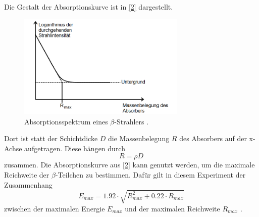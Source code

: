 Die Gestalt der Absorptionskurve ist in \autoref{2} dargestellt. 
\begin{figure}[H]
    \centering
    \includegraphics[width = 8cm]{2}
    \caption{Absorptionsspektrum eines $\beta$-Strahlers \cite{sample}.}
    \label{2}
  \end{figure}
  Dort ist statt der Schichtdicke $D$ die Massenbelegung $R$ des Absorbers auf der x-Achse aufgetragen. Diese hängen durch
\begin{equation*}
  R=\rho D
\end{equation*}
zusammen. Die Absorptionskurve aus \autoref{2} kann genutzt werden, um die maximale Reichweite der $\beta$-Teilchen zu bestimmen. Dafür gilt in diesem Experiment der Zusammenhang
\begin{equation*}
  E_{max}=1.92\cdot\sqrt{R_{max}^2+0.22\cdot R_{max}}
\end{equation*}
zwischen der maximalen Energie $E_{max}$ und der maximalen Reichweite $R_{max}$ \cite{sample}.
